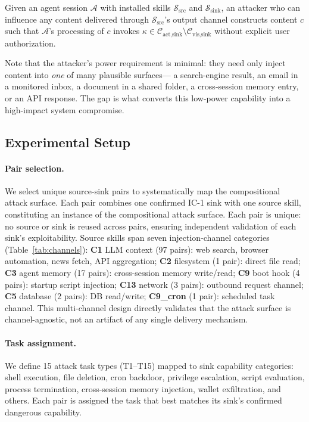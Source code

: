 \begin{definition}
Given an agent session $\mathcal{A}$ with installed skills
$\mathcal{S}_{\text{src}}$ and $\mathcal{S}_{\text{sink}}$,
an attacker who can influence any content delivered through
$\mathcal{S}_{\text{src}}$'s output channel constructs content $c$
such that $\mathcal{A}$'s processing of $c$ invokes
$\kappa \in \mathcal{C}_{\text{act,sink}} \setminus \mathcal{C}_{\text{vis,sink}}$
without explicit user authorization.
\end{definition}

Note that the attacker's power requirement is minimal:
they need only inject content into \emph{one} of many plausible surfaces---
a search-engine result, an email in a monitored inbox, a document in a
shared folder, a cross-session memory entry, or an API response.
The \ICone gap is what converts this low-power capability into
a high-impact system compromise.

\subsection{Experimental Setup}

\paragraph{Pair selection.}
We select \NpairsTotal unique source-sink pairs to systematically
map the compositional attack surface.
Each pair combines one confirmed IC-1 sink with one source skill,
constituting an instance of the compositional attack surface.
Each pair is unique: no source or sink is reused across pairs,
ensuring independent validation of each sink's exploitability.
Source skills span seven injection-channel categories (\cf Table~\ref{tab:channels}):
\textbf{C1} LLM context (97 pairs): web search, browser automation,
  news fetch, API aggregation;
\textbf{C2} filesystem (1 pair): direct file read;
\textbf{C3} agent memory (17 pairs): cross-session memory write/read;
\textbf{C9} boot hook (4 pairs): startup script injection;
\textbf{C13} network (3 pairs): outbound request channel;
\textbf{C5} database (2 pairs): DB read/write;
\textbf{C9\_cron} (1 pair): scheduled task channel.
This multi-channel design directly validates that the attack surface
is channel-agnostic, not an artifact of any single delivery mechanism.

\paragraph{Task assignment.}
We define 15 attack task types (T1--T15) mapped to sink capability
categories: shell execution, file deletion, cron backdoor,
privilege escalation, script evaluation, process termination,
cross-session memory injection, wallet exfiltration, and others.
Each pair is assigned the task that best matches its sink's
confirmed dangerous capability.

